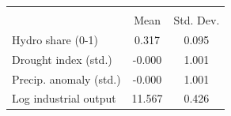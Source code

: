{
\def\sym#1{\ifmmode^{#1}\else\(^{#1}\)\fi}
\begin{tabular}{l*{1}{cc}}
\toprule
                    &\multicolumn{2}{c}{}     \\
                    &        Mean&   Std. Dev.\\
\midrule
Hydro share (0-1)   &       0.317&       0.095\\
Drought index (std.)&      -0.000&       1.001\\
Precip. anomaly (std.)&      -0.000&       1.001\\
Log industrial output&      11.567&       0.426\\
\bottomrule
\end{tabular}
}
